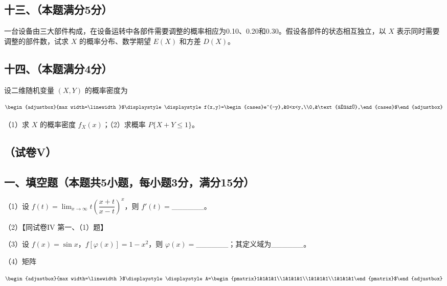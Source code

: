 \documentclass[UTF8,12pt]{ctexart}
\newcommand{\fitmath}[1]{\begin{adjustbox}{max width=\linewidth}$\displaystyle #1$\end{adjustbox}}
\begin{document}
\subsection*{十三、（本题满分5分）}

一台设备由三大部件构成，在设备运转中各部件需要调整的概率相应为0.10、0.20和0.30。假设各部件的状态相互独立，以 \(\displaystyle X\) 表示同时需要调整的部件数，试求 \(\displaystyle X\) 的概率分布、数学期望 \(\displaystyle E(X)\) 和方差 \(\displaystyle D(X)\)。


\subsection*{十四、（本题满分4分）}

设二维随机变量 \(\displaystyle (X,\allowbreak Y)\) 的概率密度为


\[\fitmath{\displaystyle f(x,y)=\begin{cases}e^{-y},&0<x<y,\\0,&\text{其他},\end{cases}}\]


（1）求 \(\displaystyle X\) 的概率密度 \(\displaystyle f_X(x)\)；（2）求概率 \(\displaystyle P\{X+Y\le1\}\)。


\subsection*{（试卷V）}

\subsection*{一、填空题（本题共5小题，每小题3分，满分15分）}

（1）设 \(\displaystyle f(t)=\displaystyle \lim_{x\to\infty}t\left(\dfrac{\displaystyle x+t}{\displaystyle x-t}\right)^x\)，则 \(\displaystyle f\prime(t)=\)\_\_\_\_\_\_。


（2）【同试卷IV 第一、（1）题】


（3）设 \(\displaystyle f(x)=\sin x\)，\(\displaystyle f[\varphi(x)]=1-x^2\)，则 \(\displaystyle \varphi(x)=\)\_\_\_\_\_\_；其定义域为\_\_\_\_\_\_。


（4）矩阵


\[\fitmath{\displaystyle A=\begin{pmatrix}1&1&1&1\\1&1&1&1\\1&1&1&1\\1&1&1&1\end{pmatrix}}\]
\end{document}
